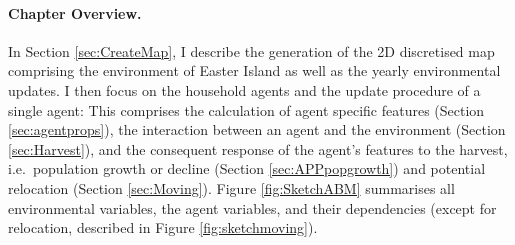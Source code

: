 
\paragraph{Chapter Overview.}
In Section \ref{sec:CreateMap}, I describe the generation of the 2D discretised map comprising the environment of Easter Island as well as the yearly environmental updates. I then focus on the household agents and the update procedure of a single agent:
This comprises the calculation of agent specific features (Section \ref{sec:agentprops}), the interaction between an agent and the environment (Section \ref{sec:Harvest}), and the consequent response of the agent's features to the harvest, i.e.\ population growth or decline (Section \ref{sec:APPpopgrowth}) and potential relocation (Section \ref{sec:Moving}).
Figure \ref{fig:SketchABM} summarises all environmental variables, the agent variables, and their dependencies (except for relocation, described in Figure \ref{fig:sketchmoving}).

